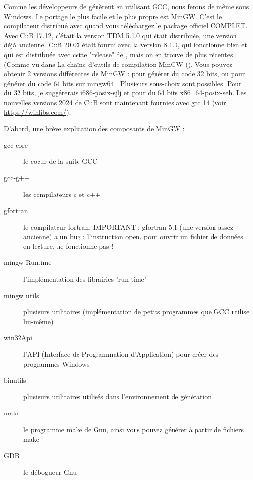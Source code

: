 Comme les développeurs de \codeblocks génèrent \codeblocks en utilisant GCC, nous ferons de même sous Windows. Le portage le plus facile et le plus propre est MinGW. C'est le compilateur distribué avec \codeblocks quand vous téléchargez le package officiel COMPLET. Avec C::B 17.12, c'était la version TDM 5.1.0 qui était distribuée, une version déjà ancienne. C::B 20.03 était fourni avec la version 8.1.0, qui fonctionne bien et qui est distribuée avec cette "release" de , mais on en trouve de plus récentes (Comme vu dans La chaîne d'outils de compilation MinGW (). Vous pouvez obtenir 2 versions différentes de MinGW : pour générer du code 32 bits, ou pour générer du code 64 bits sur \href{https://sourceforge.net/projects/mingw-w64/files/}{mingw64} \cite{url:mingw64}. Plusieurs sous-choix sont possibles. Pour du 32 bits, je suggérerais i686-posix-sjlj et pour du 64 bits x86\_64-posix-seh. Les nouvelles versions 2024 de C::B sont maintenant fournies avec gcc 14 (voir \url{https://winlibs.com/}).


D'abord, une brève explication des composants de MinGW :

\begin{description}
\item[gcc-core] le coeur de la suite GCC
\item[gcc-g++] les compilateurs c et c++
\item[gfortran] le compilateur fortran. IMPORTANT : gfortran 5.1 (une  version assez ancienne) a un bug : l'instruction open, pour ouvrir un fichier de données en lecture, ne fonctionne pas !
\item[mingw Runtime] l'implémentation des librairies "run time"
\item[mingw utils] plusieurs utilitaires (implémentation de petits programmes que GCC utilise lui-même)
\item[win32Api] l'API (Interface de Programmation d'Application) pour créer des programmes Windows
\item[binutils] plusieurs utilitaires utilisés dans l'environnement de génération
\item[make] le programme make de Gnu, ainsi vous pouvez générer à partir de fichiers make
\item[GDB] le débogueur Gnu
\end{description}

